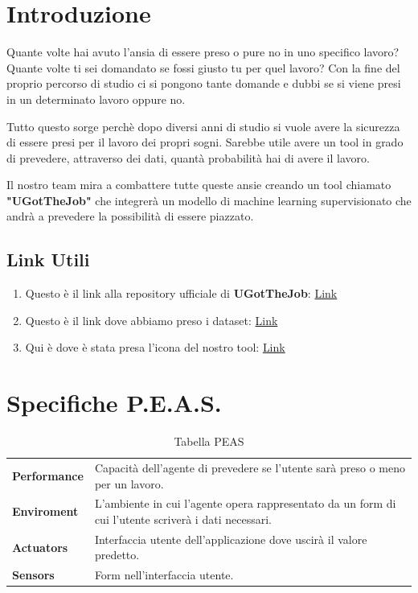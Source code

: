 \documentclass[12pt]{article}
\newcommand{\mainname}{UGotTheJob}
\begin{document}
\newpage %

\tableofcontents

\newpage

\section{Introduzione}
Quante volte hai avuto l'ansia di essere preso o pure no in uno specifico lavoro?
Quante volte ti sei domandato se fossi giusto tu per quel lavoro? Con la fine del proprio percorso
di studio ci si pongono tante domande e dubbi se si viene presi in un determinato lavoro oppure no.
\par
Tutto questo sorge perchè dopo diversi anni di studio si vuole avere la sicurezza di essere presi
per il lavoro dei propri sogni. Sarebbe utile avere un tool in grado di
prevedere, attraverso dei dati, quantà probabilità hai di avere il lavoro.
\par
Il nostro team mira a combattere tutte queste ansie creando un tool chiamato \textbf{"\mainname"}
che integrerà un modello di machine learning supervisionato che andrà a prevedere la possibilità di essere piazzato.

\subsection{Link Utili}
\begin{enumerate}
    \item Questo è il link alla repository ufficiale di \textbf{\mainname}: \href{https://github.com/ShackWove/GuessUJob}{Link}
    \item Questo è il link dove abbiamo preso i dataset: \href{https://www.kaggle.com/datasets/ahsan81/job-placement-dataset}{Link}
    \item Qui è dove è stata presa l'icona del nostro tool: \href{https://www.flaticon.com/free-icon/job-seeking_1503438}{Link}
\end{enumerate}

\section{Specifiche P.E.A.S.}

\begin{table}[ht]
    \centering
    \begin{tabular}{| l | m{8cm} |}
        \hline
        \textbf{Performance} & Capacità dell'agente di prevedere se l'utente sarà preso o meno per un lavoro.                       \\
        \textbf{Enviroment}  & L'ambiente in cui l'agente opera rappresentato da un form di cui l'utente scriverà i dati necessari. \\
        \textbf{Actuators}   & Interfaccia utente dell'applicazione dove uscirà il valore predetto.                                 \\
        \textbf{Sensors}     & Form nell'interfaccia utente.                                                                        \\
        \hline
    \end{tabular}
    \caption{Tabella PEAS}
\end{table}
\end{document}
